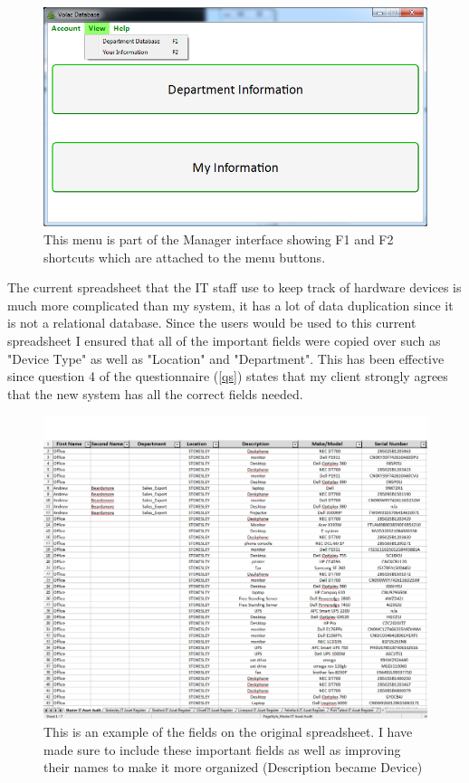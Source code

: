 \begin{figure}[H]
    \includegraphics[width=\textwidth]{./Evaluation/Images/shortcuts2.png}
    \caption{This menu is part of the Manager interface showing F1 and F2 shortcuts which are attached to the menu buttons.} 
\end{figure}


The current spreadsheet that the IT staff use to keep track of hardware devices is much more complicated than my system, it has a lot of data duplication since it is not a relational database. Since the users would be used to this current spreadsheet I ensured that all of the important fields were copied over such as "Device Type" as well as "Location" and "Department". This has been effective since question 4 of the questionnaire (\ref{qs}) states that my client strongly agrees that the new system has all the correct fields needed.

\begin{figure}[H]
    \includegraphics[width=\textwidth]{./Evaluation/Images/spreadsheet.png}
    \caption{This is an example of the fields on the original spreadsheet. I have made sure to include these important fields as well as improving their names to make it more organized (Description became Device)} 
\end{figure}

